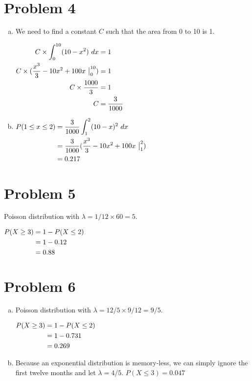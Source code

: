 \documentclass[11pt]{article}
\newenvironment{equ}{$\hfill\begin{aligned}[t]}{\end{aligned}\hfill \null$}
\begin{document}
\section*{Problem 4}
	
\begin{enumerate}[(a)]
	\item
		We need to find a constant $C$ such that the area from 0 to 10 is 1.
		
		\begin{equ}
			C \times \int _0 ^{10} (10-x^2)\ dx &= 1 \\
			C \times (\dfrac{x^3}{3} -10x^2 +100x\ \big| _0 ^{10} ) &= 1 \\
			C \times \dfrac{1000}{3} &= 1 \\
			C &= \dfrac{3}{1000}
		\end{equ}
		
	\item 
		\begin{equ}
			P(  1 \leq x \leq 2 ) &= \dfrac{3}{1000} \int _1 ^2 (10-x)^2\ dx \\
			&= \dfrac{3}{1000} (\dfrac{x^3}{3} -10x^2 +100x\ \big| _1 ^2) \\
			&= 0.217
		\end{equ}
\end{enumerate}

\section*{Problem 5}

Poisson distribution with $\lambda = 1/12 \times 60 = 5$. 

	\begin{equ}
		P(X \geq 3) &= 1 - P( X \leq 2) \\
		&= 1-0.12 \\
		&= 0.88
	\end{equ}

\section*{Problem 6}
\begin{enumerate}[(a)]
	\item Poisson distribution with $\lambda = 12/5 \times 9/12 = 9/5$.
	
		\begin{equ}
			P(X \geq 3) &= 1- P( X \leq 2 ) \\
			&= 1-0.731\\
			&= 0.269
		\end{equ}
		
	\item Because an exponential distribution is memory-less,  we can simply ignore the first twelve months and let $\lambda = 4/5$. $P( X \leq 3 ) = 0.047$
\end{enumerate}
\end{document}

